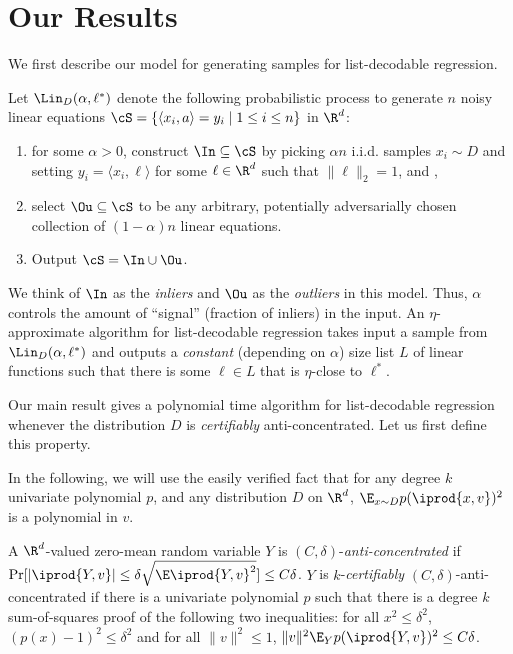 


\section{Our Results}
We first describe our model for generating samples for list-decodable regression.

\begin{model}
Let $\Lin_D(\alpha,\ell^*)$ denote the following probabilistic process to generate $n$ noisy linear equations $\cS = \{ \langle x_i, a \rangle = y_i\mid 1\leq i \leq n\}$ in $\R^d$:
\begin{enumerate}
\item for some $\alpha > 0$, construct $\In \subseteq \cS$ by picking $\alpha n$ i.i.d. samples $x_i \sim D$ and setting $y_i = \langle x_i,\ell \rangle$ for some $\ell \in \R^d$ such that $\|\ell\|_2 =1$, and ,
\item select $\Ou \subseteq \cS$ to be any arbitrary, potentially adversarially chosen collection of $(1-\alpha)n$ linear equations.
\item Output $\cS = \In \cup \Ou$.
\end{enumerate}
\label{model:random-equations}
\end{model}


We think of $\In$ as the \emph{inliers} and $\Ou$ as the \emph{outliers} in this model. 
Thus, $\alpha$ controls the amount of ``signal'' (fraction of inliers) in the input. 
An $\eta$-approximate algorithm for list-decodable regression takes input a sample from $\Lin_D(\alpha,\ell^*)$ and outputs a \emph{constant} (depending on $\alpha$) size list $L$ of linear functions such that there is some $\ell \in L$ that is $\eta$-close to $\ell^*$. 

Our main result gives a polynomial time algorithm for list-decodable regression whenever the distribution $D$ is \emph{certifiably} anti-concentrated. Let us first define this property. 

In the following, we will use the easily verified fact that for any degree $k$ univariate polynomial $p$, and any distribution $D$ on $\R^d$, $\E_{x \sim D} p(\iprod{x,v})^2$ is a polynomial in $v$. 

\begin{definition}
A $\R^d$-valued zero-mean random variable $Y$ is $(C,\delta)$-\emph{anti-concentrated} if $\Pr[ |\iprod{Y,v}| \leq \delta \sqrt{ \E \iprod{Y,v}^2}]\leq C\delta$. $Y$ is $k$-\emph{certifiably} $(C,\delta)$-anti-concentrated if there is a univariate polynomial $p$ such that there is a degree $k$ sum-of-squares proof of the following two inequalities: for all $x^2 \leq \delta^2$, $(p(x) - 1)^2 \leq \delta^2$ and for all $\|v\|^2 \leq 1$,  $\|v\|^2 \E_{Y} p(\iprod{Y,v})^2 \leq C\delta$. 
\end{definition} 


